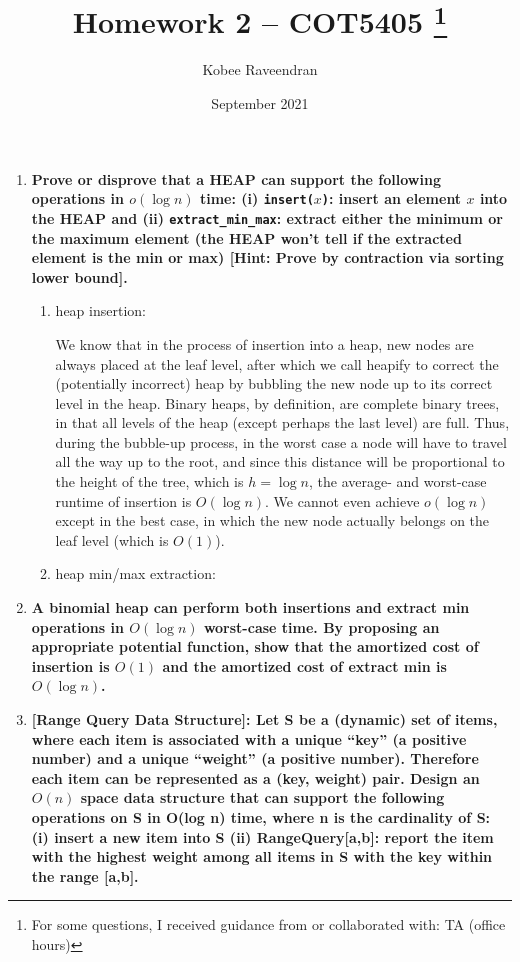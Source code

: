 \documentclass[12pt]{article}
\title{Homework 2 -- COT5405
    \thanks{For some questions, I received guidance from or collaborated with: TA (office hours)}
}
\author{Kobee Raveendran}
\date{September 2021}
\begin{document}
\maketitle

\begin{enumerate}
    \item \textbf{Prove or disprove that a HEAP can support the following operations in $o(\log n)$ time: 
    (i) \texttt{insert($x$)}: insert an element $x$ into the HEAP and (ii) \texttt{extract\_min\_max}: extract either 
    the minimum or the maximum element (the HEAP won't tell if the extracted element is the min 
    or max) [Hint: Prove by contraction via sorting lower bound].}

    \begin{enumerate}
        \item heap insertion:
        
        We know that in the process of insertion into a heap, new nodes are always placed at the leaf level, after 
        which we call heapify to correct the (potentially incorrect) heap by bubbling the new node up to its 
        correct level in the heap. Binary heaps, by definition, are complete binary trees, in that all levels of the 
        heap (except perhaps the last level) are full. Thus, during the bubble-up process, in the worst case a node will 
        have to travel all the way up to the root, and since this distance will be proportional to the height of the tree, 
        which is $h = \log n$, the average- and worst-case runtime of insertion is $O(\log n)$. We cannot even achieve 
        $o(\log n)$ except in the best case, in which the new node actually belongs on the leaf level (which is $O(1)$).

        \item heap min/max extraction:
    \end{enumerate}

    \item \textbf{A binomial heap can perform both insertions and extract min operations in $O(\log n)$ 
    worst-case time. By proposing an appropriate potential function, show that the amortized 
    cost of insertion is $O(1)$ and the amortized cost of extract min is $O(\log n)$.}
    \item \textbf{[Range Query Data Structure]: Let S be a (dynamic) set of items, where each item is 
    associated with a unique ``key'' (a positive number) and a unique ``weight'' (a positive 
    number). Therefore each item can be represented as a (key, weight) pair. Design an $O(n)$ 
    space data structure that can support the following operations on S in O(log n) time, where 
    n is the cardinality of S: (i) insert a new item into S (ii) RangeQuery[a,b]: report the 
    item with the highest weight among all items in S with the key within the range [a,b].}


\end{enumerate}
\end{document}

